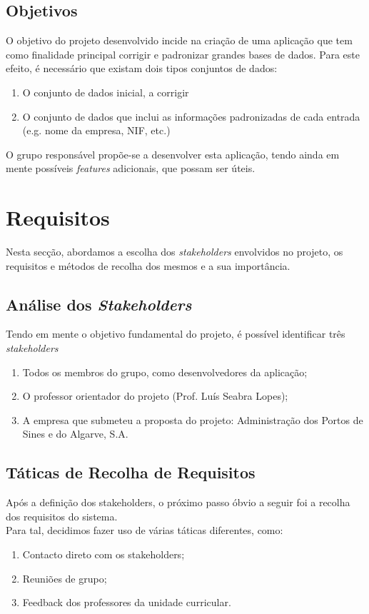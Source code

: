\documentclass[a4paper,12pt]{article}
\begin{document}
\subsection{Objetivos}
O objetivo do projeto desenvolvido incide na criação de uma aplicação que tem como finalidade principal corrigir e padronizar grandes bases de dados. Para este efeito, é necessário que existam dois tipos conjuntos de dados: 
\begin{enumerate}
    \item O conjunto de dados inicial, a corrigir
    \item O conjunto de dados que inclui as informações padronizadas de cada entrada (e.g. nome da empresa, NIF, etc.) 
\end{enumerate}
O grupo responsável propõe-se a desenvolver esta aplicação, tendo ainda em mente possíveis \textit{features} adicionais, que possam ser úteis. 

\section{Requisitos}
Nesta secção, abordamos a escolha dos \textit{stakeholders} envolvidos no projeto, os 
requisitos e métodos de recolha dos mesmos e a sua importância.

\subsection{Análise dos \textit{Stakeholders}}
Tendo em mente o objetivo fundamental do projeto, é possível identificar três \textit{stakeholders}
\begin{enumerate}
    \item Todos os membros do grupo, como desenvolvedores da aplicação;
    \item O professor orientador do projeto (Prof. Luís Seabra Lopes);
    \item A empresa que submeteu a proposta do projeto:  Administração dos Portos de Sines e
do Algarve, S.A.
\end{enumerate}

\subsection{Táticas de Recolha de Requisitos}
Após a definição dos stakeholders, o próximo passo óbvio a seguir foi a recolha dos requisitos do sistema.\\
Para tal, decidimos fazer uso de várias táticas diferentes, como:
\begin{enumerate}
    \item Contacto direto com os stakeholders;
    \item Reuniões de grupo;
    \item Feedback dos professores da unidade curricular.
\end{enumerate}
\end{document}
